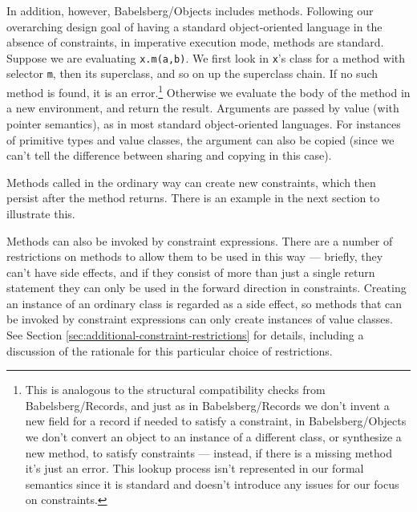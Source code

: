 \documentclass{article}
\begin{document}
In addition, however, Babelsberg/Objects includes methods.  Following
our overarching design goal of having a standard object-oriented
language in the absence of constraints, in imperative execution mode,
methods are standard.  Suppose we are evaluating \verb|x.m(a,b)|.  We
first look in \verb|x|'s class for a method with selector \verb|m|,
then its superclass, and so on up the superclass chain.  If no such
method is found, it is an error.\footnote{This is analogous to the
  structural compatibility checks from Babelsberg/Records, and just as
  in Babelsberg/Records we don't invent a new field for a record if
  needed to satisfy a constraint, in Babelsberg/Objects we don't
  convert an object to an instance of a different class, or synthesize
  a new method, to satisfy constraints --- instead, if there is a
  missing method it's just an error.  This lookup process isn't
  represented in our formal semantics since it is standard and doesn't
  introduce any issues for our focus on constraints.}
Otherwise we evaluate the body of the method in a new environment, and
return the result.  Arguments are passed by value (with pointer
semantics), as in most standard object-oriented languages.  For
instances of primitive types and value classes, the argument can also
be copied (since we can't tell the difference between sharing and
copying in this case).

Methods called in the ordinary way can create new constraints, which
then persist after the method returns.  There is an example in the
next section to illustrate this.

Methods can also be invoked by constraint expressions.  There are a
number of restrictions on methods to allow them to be used in this way
--- briefly, they can't have side effects, and if they consist of more
than just a single return statement they can only be used in the
forward direction in constraints.  Creating an instance of an ordinary
class is regarded as a side effect, so methods that can be invoked by
constraint expressions can only create instances of value classes.
See Section \ref{sec:additional-constraint-restrictions} for details,
including a discussion of the rationale for this particular choice of
restrictions.
\end{document}
